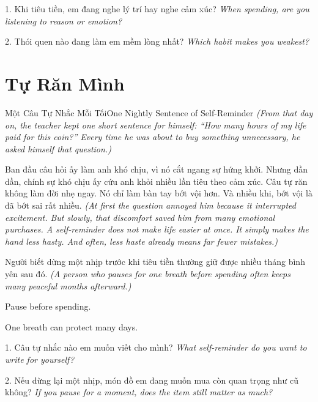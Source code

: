 \begin{tuhocnhanh}
1. Khi tiêu tiền, em đang nghe lý trí hay nghe cảm xúc? \textit{When spending, are you listening to reason or emotion?}

2. Thói quen nào đang làm em mềm lòng nhất? \textit{Which habit makes you weakest?}
\end{tuhocnhanh}
\ngancach

\section{Tự Răn Mình}
\begin{truyen}{Một Câu Tự Nhắc Mỗi Tối}{One Nightly Sentence of Self-Reminder}
\textit{(From that day on, the teacher kept one short sentence for himself: ``How many hours of my life paid for this coin?'' Every time he was about to buy something unnecessary, he asked himself that question.)}

Ban đầu câu hỏi ấy làm anh khó chịu, vì nó cắt ngang sự hứng khởi. Nhưng dần dần, chính sự khó chịu ấy cứu anh khỏi nhiều lần tiêu theo cảm xúc. Câu tự răn không làm đời nhẹ ngay. Nó chỉ làm bàn tay bớt vội hơn. Và nhiều khi, bớt vội là đã bớt sai rất nhiều.
\textit{(At first the question annoyed him because it interrupted excitement. But slowly, that discomfort saved him from many emotional purchases. A self-reminder does not make life easier at once. It simply makes the hand less hasty. And often, less haste already means far fewer mistakes.)}
\end{truyen}

\begin{baihoc}
Người biết dừng một nhịp trước khi tiêu tiền thường giữ được nhiều tháng bình yên sau đó.
\textit{(A person who pauses for one breath before spending often keeps many peaceful months afterward.)}
\end{baihoc}

\begin{ghinhoanh}
Pause before spending.

One breath can protect many days.
\end{ghinhoanh}

\begin{tuhocnhanh}
1. Câu tự nhắc nào em muốn viết cho mình? \textit{What self-reminder do you want to write for yourself?}

2. Nếu dừng lại một nhịp, món đồ em đang muốn mua còn quan trọng như cũ không? \textit{If you pause for a moment, does the item still matter as much?}
\end{tuhocnhanh}

